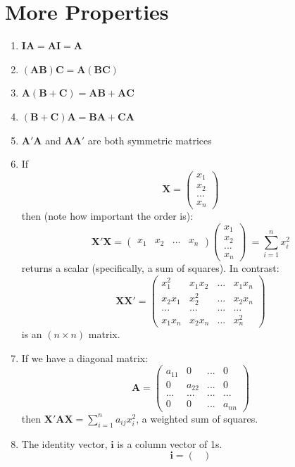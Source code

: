 \documentclass[11pt]{article}
\theoremstyle{definition}
\theoremstyle{remark}
\begin{document}
\section{More Properties}
\begin{enumerate}
\item $\mathbf{IA}=\mathbf{AI}=\mathbf{A}$
\item $\mathbf{(AB)C}=\mathbf{A(BC)}$
\item $\mathbf{A(B+C)}=\mathbf{AB}+\mathbf{AC}$
\item $\mathbf{(B+C)A}=\mathbf{BA}+\mathbf{CA}$
\item $\mathbf{A}'\mathbf{A}$ and $\mathbf{A}\mathbf{A}'$ are both symmetric matrices
\item If 
$$
\mathbf{X} =
\begin{pmatrix}
x_1 \\
x_2 \\
... \\
x_n
\end{pmatrix}
$$
then (note how important the order is):
$$
\mathbf{X'X} =
\begin{pmatrix}
x_1&x_2&...&x_n
\end{pmatrix}
\begin{pmatrix}
x_1 \\
x_2 \\
... \\
x_n
\end{pmatrix}\ = \sum_{i=1}^{n} x_{i}^{2}
$$
returns a scalar (specifically, a sum of squares).
In contrast: 
$$
\mathbf{XX'} = 
\begin{pmatrix}
x_{1}^{2}&x_1x_2&...&x_1x_n \\
x_2x_1&x_{2}^{2}&...&x_2x_n \\
...&...&...&... \\
x_1x_n&x_2x_n&...&x_{n}^{2}
\end{pmatrix}
$$
is an $(n \times n)$ matrix.
\item If we have a diagonal matrix: 
$$
\textbf{A} =
\begin{pmatrix}
a_{11}&0&...&0\\
0&a_{22}&...&0\\
...&...&...&...\\
0&0&...&a_{nn}\end{pmatrix}
$$
then $\mathbf{X'AX}=\sum_{i=1}^{n}a_{ij}x_{i}^{2}$, a weighted sum of squares.
\item The identity vector, $\mathbf{i}$ is a column vector of 1s.
$$
\mathbf{i} = 
\begin{pmatrix}

\end{pmatrix}$$
\end{enumerate}
\end{document}
